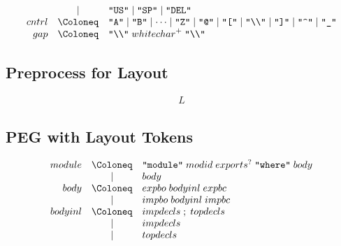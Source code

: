 \begin{align*}
\begin{array}{rcl}
    \\
    & \mid & \text{\texttt{\textquotedbl US\textquotedbl}}
    \mid \text{\texttt{\textquotedbl SP\textquotedbl}}
    \mid \text{\texttt{\textquotedbl DEL\textquotedbl}}
    \\
    {cntrl}
    & \Coloneq & \text{\texttt{\textquotedbl A\textquotedbl}} \mid \text{\texttt{\textquotedbl B\textquotedbl}} \mid \cdots \mid \text{\texttt{\textquotedbl Z\textquotedbl}}
    \mid \text{\texttt{\textquotedbl @\textquotedbl}}
    \mid \text{\texttt{\textquotedbl [\textquotedbl}}
    \mid \text{\texttt{\textquotedbl\textbackslash\textbackslash\textquotedbl}}
    \mid \text{\texttt{\textquotedbl ]\textquotedbl}}
    \mid \text{\texttt{\textquotedbl\textasciicircum\textquotedbl}}
    \mid \text{\texttt{\textquotedbl\textunderscore\textquotedbl}}
    \\
    {gap}
    & \Coloneq & \text{\texttt{\textquotedbl\textbackslash\textbackslash\textquotedbl}}\; {whitechar}^+\; \text{\texttt{\textquotedbl\textbackslash\textbackslash\textquotedbl}}
  \end{array}
\end{align*}

\subsection{Preprocess for Layout}

\begin{align*}
  L
\end{align*}

\subsection{PEG with Layout Tokens}

\begin{align*}
  \begin{array}{rcl}
    {module}
    & \Coloneq & \text{\texttt{\textquotedbl module\textquotedbl}}\; {modid}\; {exports}^?\; \text{\texttt{\textquotedbl where\textquotedbl}}\; {body} \\
    & \mid & {body} \\
    {body}
    & \Coloneq & {expbo}\; {bodyinl}\; {expbc} \\
    & \mid & {impbo}\; {bodyinl}\; {impbc} \\
    {bodyinl}
    & \Coloneq & {impdecls}\; ;\; {topdecls} \\
    & \mid & {impdecls} \\
    & \mid & {topdecls} \\
  \end{array}
\end{align*}

